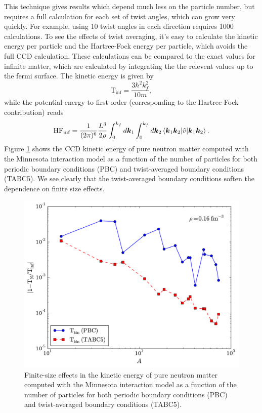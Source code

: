   This technique gives results which depend much less on the particle
  number, but requires a full calculation for each set of twist
  angles, which can grow very quickly. For example, using 10 twist
  angles in each direction requires 1000 calculations. To see the
  effects of twist averaging, it's easy to calculate the kinetic
  energy per particle and the Hartree-Fock energy per particle, which
  avoids the full CCD calculation. These calculations can be compared
  to the exact values for infinite matter, which are calculated by
  integrating the the relevent values up to the fermi surface. The kinetic energy is given by
  \[
\text{T}_{\text{inf}}=\frac{3\hbar^{2}k_{f}^{2}}{10m},
\]
while the potential energy to first order (corresponding to the Hartree-Fock contribution) reads
\[
\text{HF}_{\text{inf}}=\frac{1}{\mathop{(2\pi)^{6}}}\frac{L^{3}}{2\rho}\int_{0}^{k_{f}}d\vec{k}_{1}\int_{0}^{k_{f}}d\vec{k}_{2}\braket{\vec{k}_{1}\vec{k}_{2}|\hat{v}|\vec{k}_{1}\vec{k}_{2}}.
\]
Figure \ref{fig:fig3} shows the CCD kinetic energy of pure neutron
      matter computed with the Minnesota interaction model  \cite{minnesota} as a function of
      the number of particles for both periodic boundary conditions (PBC)
      and twist-averaged boundary conditions (TABC5). We see clearly that the 
twist-averaged boundary conditions soften the dependence on finite size effects. 
  \begin{figure}
    \includegraphics[width=\linewidth]{Chapter8-figures/fig3.pdf}
    \caption{Finite-size effects in the kinetic energy of pure neutron
      matter computed with the Minnesota interaction model  \cite{minnesota} as a function of
      the number of particles for both periodic boundary conditions (PBC)
      and twist-averaged boundary conditions (TABC5).}
    \label{fig:fig3}
  \end{figure}
